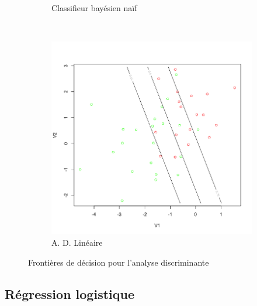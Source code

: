 \documentclass[a4paper,10pt]{report}
\begin{document}
\begin{figure}[H]
\begin{subfigure}[b]{0.5\linewidth}
		\caption{\small Classifieur bayésien naïf}
	\end{subfigure}\\%
	\begin{subfigure}[b]{0.5\linewidth}
		\centering
		\captionsetup{justification=centering, margin=1cm}
		\includegraphics[width=1\linewidth]{img/1-3-verif-adl}
		\caption{\small A. D. Linéaire}
	\end{subfigure}%
	\caption{\small Frontières de décision pour l'analyse discriminante}
	\label{fig:1-3-anadisc}%
\end{figure}


\subsection{Régression logistique}
\end{document}
